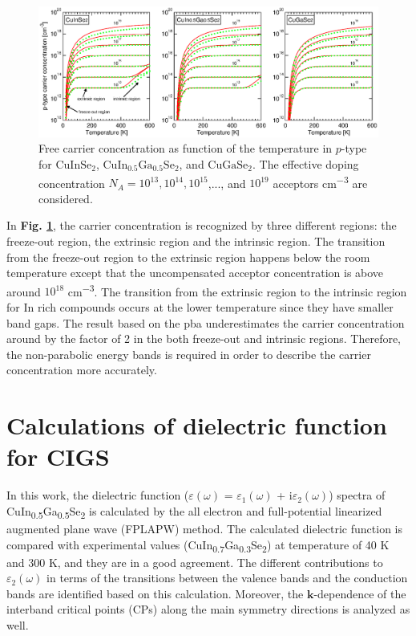 \documentclass[a4paper, 12pt, titlepage,oneside,drop]{kthesis}
\begin{document}
 \begin{figure}[H]
    \begin{center}
            \includegraphics[width=1\textwidth,clip]{paper2figure9}
     \end{center}
    \caption{Free carrier concentration as function of the temperature in $p$-type for $\mathrm{CuInSe_2}$, $\mathrm{CuIn_{0.5}Ga_{0.5}Se_2}$, and $\mathrm{CuGaSe_2}$.
    The effective doping concentration $N_A = 10^{13}, 10^{14}, 10^{15}$,..., and  $10^{19}$ acceptors cm\textsuperscript{$-$3} are considered.}
   \label{ptypecc}
\end{figure}

In \textbf{Fig. \ref{ptypecc}}, the carrier concentration is recognized by three different regions: the freeze-out region, the extrinsic region and the intrinsic region. The 
transition from the freeze-out region to the extrinsic region happens below the room temperature except that the uncompensated acceptor concentration is above around 
$10^{18}$ cm\textsuperscript{$-$3}. The transition from the extrinsic region to the intrinsic region for In rich compounds occurs at the lower temperature since they have smaller band gaps.
The result based on the pba underestimates the carrier concentration around by the factor of 2 in the both freeze-out and intrinsic regions. Therefore, the 
non-parabolic energy bands is required in order to describe the carrier concentration more accurately.


\section{Calculations of dielectric function for CIGS}
In this work, the dielectric function ($\varepsilon (\omega)$ = $\varepsilon_1 (\omega)$ + i$\varepsilon_2 (\omega)$) spectra of CuIn\textsubscript{0.5}Ga\textsubscript{0.5}Se\textsubscript{2} is calculated by the all electron
and full-potential linearized augmented plane wave (FPLAPW) method. The calculated dielectric function is compared with experimental values (CuIn\textsubscript{0.7}Ga\textsubscript{0.3}Se\textsubscript{2}) at temperature 
of 40 K and 300 K, and they are in a good agreement. The different contributions to $\varepsilon_2(\omega)$ in terms of the transitions between the valence bands and the conduction bands are identified based on this calculation.
Moreover, the $\textbf{k}$-dependence of the interband critical points (CPs) along the main symmetry directions is analyzed as well.
\end{document}
